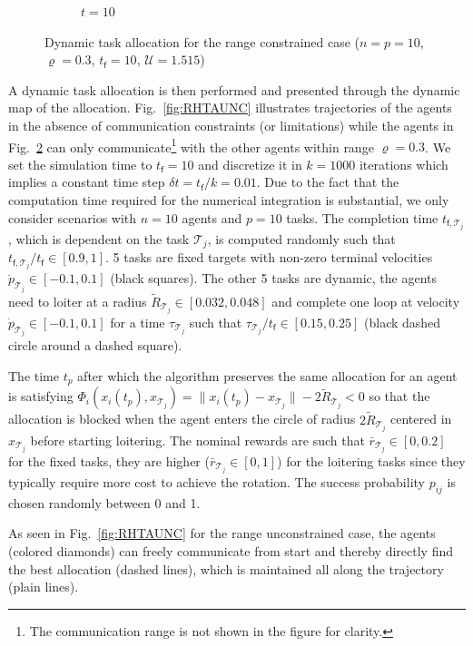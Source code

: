 \documentclass{ifacconf}
\newcommand{\f}{{\mathsf{f}}}
\newcommand{\cT}{\mathcal{T}}
\newcommand{\cU}{\mathcal{U}}
\begin{document}
\begin{figure}[h]
\begin{subfigure}{\linewidth}
  \caption{$t=10$}
  \label{fig:Ex_Im3}
\end{subfigure}
\caption{Dynamic task allocation for the range constrained case ($n=p=10$, $\varrho = 0.3$, $t_\f=10$, $\cU=1.515$)}
\label{fig:RHTA}
\end{figure}

A dynamic task allocation is then performed and presented through the dynamic map of the allocation. Fig.~\ref{fig:RHTAUNC} illustrates trajectories of the agents in the absence of communication constraints (or limitations) while the agents in Fig.~\ref{fig:RHTA} can only communicate\footnote{The communication range is not shown in the figure for clarity.} with the other agents within range $\varrho = 0.3$.
We set the simulation time to $t_\f=10$ and discretize it in $k=1000$ iterations which implies a constant time step $\delta t = t_\f/k = 0.01$.
Due to the fact that the computation time required for the numerical integration is substantial, we only consider scenarios with $n=10$ agents and $p=10$ tasks. The completion time $t_{\f,\cT_j}$, which is dependent on the task $\cT_j$, is computed randomly such that $t_{\f,\cT_j}/t_\f \in [0.9,1]$. 5 tasks are fixed targets with non-zero terminal velocities $\dot{p}_{\cT_j} \in [-0.1,0.1]$ (black squares). The other 5 tasks are dynamic, the agents need to loiter at a radius $\tilde{R}_{\cT_j} \in [0.032,0.048]$ and complete one loop at velocity $\dot{p}_{\cT_j} \in [-0.1,0.1]$ for a time $\tau_{\cT_j}$ such that $\tau_{\cT_j}/t_\f \in [0.15,0.25]$ (black dashed circle around a dashed square).

The time $t_{p}$ after which the algorithm preserves the same allocation for an agent is satisfying $\Phi_i( x_i(t_p), x_{\cT_j}) = \|x_i(t_p) - x_{\cT_j} \| - 2 \tilde{R}_{\cT_j} < 0 $ so that the allocation is blocked when the agent enters the circle of radius $2 \tilde{R}_{\cT_j}$ centered in $x_{\cT_j}$ before starting loitering.
The nominal rewards are such that $\bar{r}_{\cT_j} \in [0,0.2]$ for the fixed tasks, they are higher ($\bar{r}_{\cT_j} \in [0,1]$) for the loitering tasks since they typically require more cost to achieve the rotation. The success probability $p_{ij}$ is chosen randomly between 0 and 1.

As seen in Fig.~\ref{fig:RHTAUNC} for the range unconstrained case, the agents (colored diamonds) can freely communicate from start and thereby directly find the best allocation (dashed lines), which is maintained all along the trajectory (plain lines).
\end{document}
